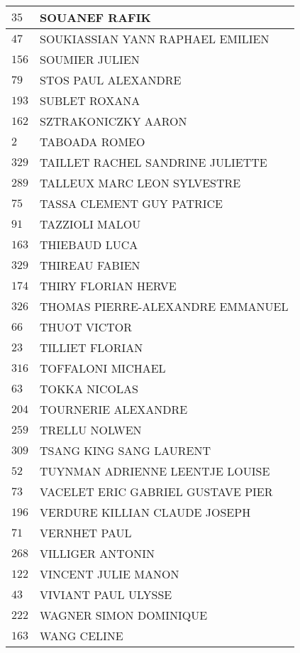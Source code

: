 \begin{xltabular}{\linewidth}{|l|X|}
    \hline
    $35$ & SOUANEF RAFIK \\
    \hline
    $47$ & SOUKIASSIAN YANN RAPHAEL EMILIEN \\
    \hline
    $156$ & SOUMIER JULIEN \\
    \hline
    $79$ & STOS PAUL ALEXANDRE \\
    \hline
    $193$ & SUBLET ROXANA \\
    \hline
    $162$ & SZTRAKONICZKY AARON \\
    \hline
    $2$ & TABOADA ROMEO \\
    \hline
    $329$ & TAILLET RACHEL SANDRINE JULIETTE \\
    \hline
    $289$ & TALLEUX MARC LEON SYLVESTRE \\
    \hline
    $75$ & TASSA CLEMENT GUY PATRICE \\
    \hline
    $91$ & TAZZIOLI MALOU \\
    \hline
    $163$ & THIEBAUD LUCA \\
    \hline
    $329$ & THIREAU FABIEN \\
    \hline
    $174$ & THIRY FLORIAN HERVE \\
    \hline
    $326$ & THOMAS PIERRE-ALEXANDRE EMMANUEL \\
    \hline
    $66$ & THUOT VICTOR \\
    \hline
    $23$ & TILLIET FLORIAN \\
    \hline
    $316$ & TOFFALONI MICHAEL \\
    \hline
    $63$ & TOKKA NICOLAS \\
    \hline
    $204$ & TOURNERIE ALEXANDRE \\
    \hline
    $259$ & TRELLU NOLWEN \\
    \hline
    $309$ & TSANG KING SANG LAURENT \\
    \hline
    $52$ & TUYNMAN ADRIENNE LEENTJE LOUISE \\
    \hline
    $73$ & VACELET ERIC GABRIEL GUSTAVE PIER \\
    \hline
    $196$ & VERDURE KILLIAN CLAUDE JOSEPH \\
    \hline
    $71$ & VERNHET PAUL \\
    \hline
    $268$ & VILLIGER ANTONIN \\
    \hline
    $122$ & VINCENT JULIE MANON \\
    \hline
    $43$ & VIVIANT PAUL ULYSSE \\
    \hline
    $222$ & WAGNER SIMON DOMINIQUE \\
    \hline
    $163$ & WANG CELINE \\

\end{xltabular}
